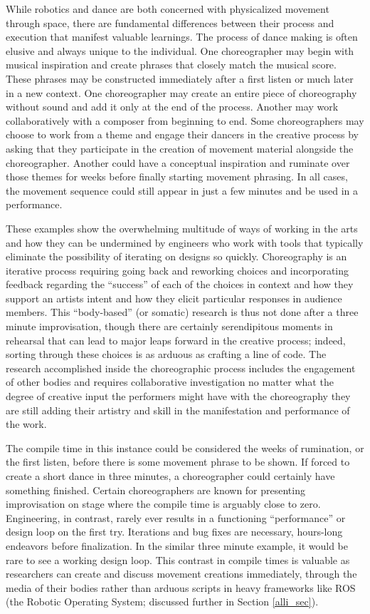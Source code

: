 \documentclass[arts,article,submit,moreauthors,pdftex,10pt,a4paper]{mdpi}
\begin{document}
While robotics and dance are both concerned with physicalized movement through space, there are fundamental differences between their process and execution that manifest valuable learnings. The process of dance making is often elusive and always unique to the individual.  One choreographer may begin with musical inspiration and create phrases that closely match the musical score.  These phrases may be constructed immediately after a first listen or much later in a new context.  One choreographer may create an entire piece of choreography without sound and add it only at the end of the process.  Another may work collaboratively with a composer from beginning to end.  Some choreographers may choose to work from a theme and engage their dancers in the creative process by asking that they participate in the creation of movement material alongside the choreographer.  Another could have a conceptual inspiration and ruminate over those themes for weeks before finally starting movement phrasing.  In all cases, the movement sequence could still appear in just a few minutes and be used in a performance.  

These examples show the overwhelming multitude of ways of working in the arts and how they can be undermined by engineers who work with tools that typically eliminate the possibility of iterating on designs so quickly.   Choreography is an iterative process requiring going back and reworking choices and incorporating feedback regarding the ``success'' of each of the choices in context and how they support an artists intent and how they elicit particular responses in audience members. This ``body-based'' (or somatic) research is thus not done after a three minute improvisation, though there are certainly serendipitous moments in rehearsal that can lead to major leaps forward in the creative process; indeed, sorting through these choices is as arduous as crafting a line of code. The research accomplished inside the choreographic process includes the engagement of other bodies and requires collaborative investigation no matter what the degree of creative input the performers might have with the choreography they are still adding their artistry and skill in the manifestation and performance of the work. 

The compile time in this instance could be considered the weeks of rumination, or the first listen, before there is some movement phrase to be shown.  If forced to create a short dance in three minutes, a choreographer could certainly have something finished.  Certain choreographers are known for presenting improvisation on stage where the compile time is arguably close to zero.  Engineering, in contrast, rarely ever results in a functioning ``performance'' or design loop on the first try.  Iterations and bug fixes are necessary, hours-long endeavors before finalization.  In the similar three minute example, it would be rare to see a working design loop.  This contrast in compile times is valuable as researchers can create and discuss movement creations immediately, through the media of their bodies rather than arduous scripts in heavy frameworks like ROS (the Robotic Operating System; discussed further in Section \ref{alli_sec}).
\end{document}
